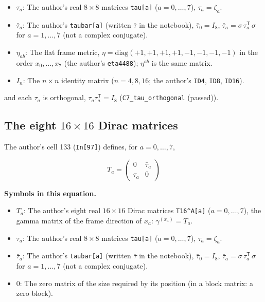 \documentclass[
  10pt,
]{article}
\providecommand{\tightlist}{%
  \setlength{\itemsep}{0pt}\setlength{\parskip}{0pt}}
\begin{document}
\begin{itemize}
\tightlist
\item
  \(\tau_a\): The author's real \(8 \times 8\) matrices
  \texttt{tau{[}a{]}} (\(a = 0, \dots, 7\)), \(\tau_a = \zeta_a\).
\item
  \(\bar\tau_a\): The author's \texttt{taubar{[}a{]}} (written
  \(\overline{\tau}\) in the notebook), \(\bar\tau_0 = I_8\),
  \(\bar\tau_a = \sigma\,\tau_a^{\mathsf T}\,\sigma\) for
  \(a = 1, \dots, 7\) (not a complex conjugate).
\item
  \(\eta_{ab}\): The flat frame metric,
  \(\eta = \mathrm{diag}(+1, +1, +1, +1, -1, -1, -1, -1)\) in the order
  \(x_0, \dots, x_7\) (the author's \texttt{eta4488}); \(\eta^{ab}\) is
  the same matrix.
\item
  \(I_n\): The \(n \times n\) identity matrix (\(n = 4, 8, 16\); the
  author's \texttt{ID4}, \texttt{ID8}, \texttt{ID16}).
\end{itemize}

and each \(\tau_a\) is orthogonal, \(\tau_a\tau_a^{\mathsf T} = I_8\)
(\texttt{C7\_tau\_orthogonal} (passed)).

\hypertarget{the-eight-16-times-16-dirac-matrices}{%
\subsection{\texorpdfstring{The eight \(16 \times 16\) Dirac
matrices}{The eight 16 \textbackslash times 16 Dirac matrices}}\label{the-eight-16-times-16-dirac-matrices}}

The author's cell 133 (\texttt{In{[}97{]}}) defines, for
\(a = 0, \dots, 7\),

\[
T_a = \begin{pmatrix} 0 & \bar\tau_a \\ \tau_a & 0 \end{pmatrix}
\]

\textbf{Symbols in this equation.}

\begin{itemize}
\tightlist
\item
  \(T_a\): The author's eight real \(16 \times 16\) Dirac matrices
  \texttt{T16\^{}A{[}a{]}} (\(a = 0, \dots, 7\)), the gamma matrix of
  the frame direction of \(x_a\): \(\gamma^{(x_a)} = T_a\).
\item
  \(\tau_a\): The author's real \(8 \times 8\) matrices
  \texttt{tau{[}a{]}} (\(a = 0, \dots, 7\)), \(\tau_a = \zeta_a\).
\item
  \(\bar\tau_a\): The author's \texttt{taubar{[}a{]}} (written
  \(\overline{\tau}\) in the notebook), \(\bar\tau_0 = I_8\),
  \(\bar\tau_a = \sigma\,\tau_a^{\mathsf T}\,\sigma\) for
  \(a = 1, \dots, 7\) (not a complex conjugate).
\item
  \(0\): The zero matrix of the size required by its position (in a
  block matrix: a zero block).
\end{itemize}
\end{document}
